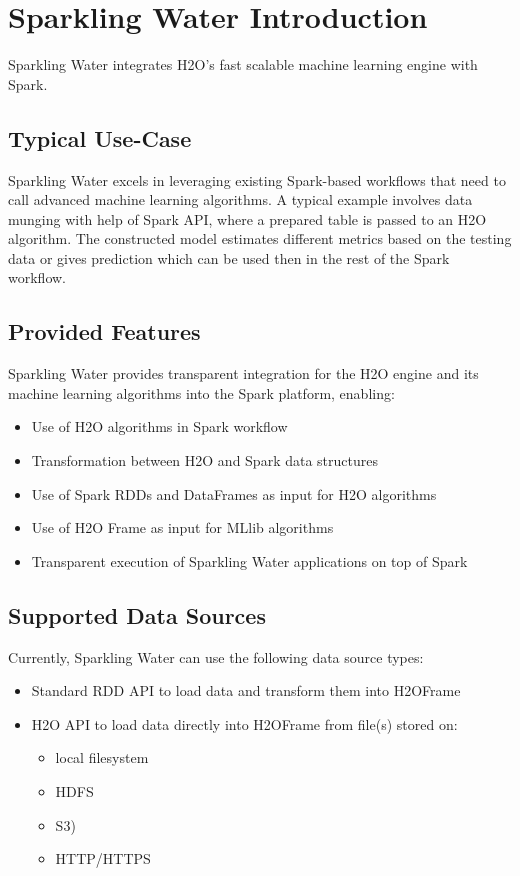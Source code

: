 \section{Sparkling Water Introduction}

Sparkling Water integrates H2O's fast scalable machine learning engine with Spark.

\subsection{Typical Use-Case}
Sparkling Water excels in leveraging existing Spark-based workflows that need to call advanced machine learning algorithms. A typical example involves data munging with help of Spark API, where a prepared table is passed to an H2O algorithm. The constructed model estimates different metrics based on the testing data or gives prediction which can be used then in the rest of the Spark workflow.

\subsection{Provided Features}

Sparkling Water provides transparent integration for the H2O engine and its machine learning algorithms into the Spark platform, enabling:

\begin{itemize}
 \item Use of H2O algorithms in Spark workflow
 \item Transformation between H2O and Spark data structures
 \item Use of Spark RDDs and DataFrames as input for H2O algorithms
 \item Use of H2O Frame as input for MLlib algorithms
 \item Transparent execution of Sparkling Water applications on top of Spark
\end{itemize}

\subsection{Supported Data Sources}

Currently, Sparkling Water can use the following data source types:

\begin{itemize}
 \item Standard RDD API to load data and transform them into H2OFrame
 \item H2O API to load data directly into H2OFrame from file(s) stored on:
  \begin{itemize}
    \item local filesystem
    \item HDFS
    \item S3)
    \item HTTP/HTTPS
  \end{itemize}
\end{itemize}

